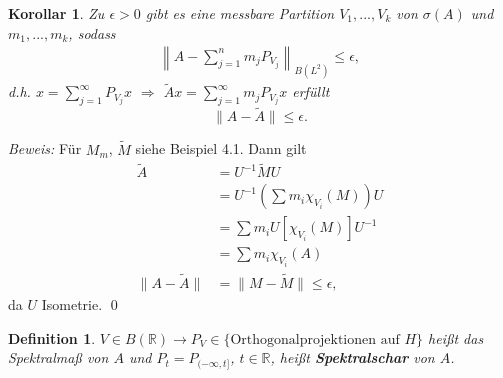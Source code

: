 \documentclass[12pt]{extreport} %
\newtheorem{Definition}[Satz]{Definition}
\newtheorem{Korollar}[Satz]{Korollar}
\numberwithin{equation}{section}
\newcommand{\R}{\mathbb{R}} %
\newcommand{\Bew}{\emph{Beweis: }}
\begin{document}
	\begin{Korollar}
		Zu $\epsilon>0$ gibt es eine messbare Partition $V_1,...,V_k$ von $\sigma(A)$ und $m_1,...,m_k$, sodass
		\begin{align*}
			\left\| A-\sum_{j = 1}^{n}m_j P_{V_j}\right\|_{B(L^2)}\leq \epsilon,
		\end{align*}
		d.h. $x = \sum_{j = 1}^{\infty} P_{V_j}x$ $\Rightarrow$ $\tilde{A}x = \sum_{j = 1}^{\infty}m_j P_{V_j}x$ erfüllt
		$$\|A-\tilde{A}\|\leq \epsilon.$$
	\end{Korollar}
	
	
	\Bew Für $M_m$, $\tilde{M}$ siehe Beispiel 4.1. Dann gilt
	\begin{align*}
		\tilde{A} &= U^{-1}\tilde M U \\
		&= U^{-1}\left(\sum m_i\chi_{V_i}(M)\right) U \\
		&= \sum m_i U[\chi_{V_i}(M)] U^{-1}\\
		&= \sum m_i \chi_{V_i}(A)\\
		\|A-\tilde A\| &= \|M-\tilde{M}\| \leq \epsilon,
	\end{align*}
	da $U$ Isometrie.
	\qed
	
	\begin{Definition}
		$V\in B(\R)\rightarrow P_V\in \{\text{Orthogonalprojektionen auf }H\}$ heißt das Spektralmaß von $A$ und $P_t = P_{(-\infty, t]}$, $t\in\R$, heißt \textbf{Spektralschar} von $A$.
	\end{Definition}
	
\end{document}
